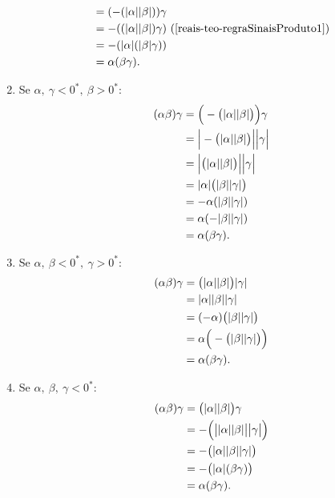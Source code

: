 \documentclass[../main.tex]{subfiles}
\begin{document}
\begin{dem}
\begin{enumerate}
\begin{align*}
                 &= (-(\abs{\alpha}\abs{\beta}))\gamma \\
                 &= -((\abs{\alpha}\abs{\beta})\gamma) \text{ (\Cref{reais-teo-regraSinaisProduto1})} \\
                 &= -(\abs{\alpha}(\abs{\beta}\gamma)) \\
                 &= \alpha(\beta\gamma).
            \end{align*}
        \item Se $\alpha,\ \gamma < 0^*,\ \beta > 0^*$:
            \begin{align*}
                (\alpha\beta)\gamma
                &= \Big( -\big(\abs{\alpha}\abs{\beta} \big) \Big)\gamma \\
                &= \Big| -\big( \abs{\alpha} \abs{\beta} \big) \Big| \Big| \gamma \Big| \\
                &= \Big| \big( \abs{\alpha} \abs{\beta} \big) \Big| \Big| \gamma \Big| \\ 
                &= \abs{\alpha} \big( \abs{\beta} \abs{\gamma} \big) \\
                &= -\alpha (\abs{\beta}\abs{\gamma}) \\
                &= \alpha(-\abs{\beta}\abs{\gamma}) \\
                &= \alpha (\beta\gamma).               
            \end{align*}       
        \item Se $\alpha,\ \beta < 0^*,\ \gamma > 0^*$:
            \begin{align*}
                (\alpha\beta)\gamma
                &= \big( \abs{\alpha} \abs{\beta} \big) \abs{\gamma} \\
                &= \abs{\alpha}  \abs{\beta} \abs{\gamma} \\
                &= (-\alpha)\big(\abs{\beta}\abs{\gamma}\big) \\
                &= \alpha \Big( - \big( \abs{\beta} \abs{\gamma} \big) \Big) \\
                &= \alpha(\beta\gamma).
            \end{align*}  
        \item Se $\alpha,\ \beta,\ \gamma < 0^* $:
            \begin{align*}
                (\alpha\beta)\gamma 
                &= \big(\abs{\alpha}\abs{\beta}\big)\gamma \\
                &= -\Big(\big|\abs{\alpha}\abs{\beta}\big|\big|\gamma\big|\Big) \\
                &= -\big(\abs{\alpha}\abs{\beta}\abs{\gamma}\big) \\
                &= -\big( \abs{\alpha} (\beta\gamma) \big) \\
                &= \alpha(\beta\gamma).
            \end{align*}
    \end{enumerate}
\end{dem}
\end{document}
